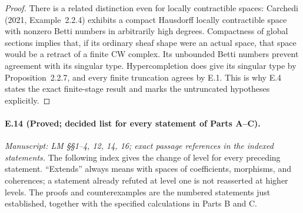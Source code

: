 \begin{proof}
There is a related distinction even for locally contractible spaces: Carchedi (2021, Example~2.2.4) exhibits a compact Hausdorff locally contractible space with nonzero Betti numbers in arbitrarily high degrees. Compactness of global sections implies that, if its ordinary sheaf shape were an actual space, that space would be a retract of a finite CW complex. Its unbounded Betti numbers prevent agreement with its singular type. Hypercompletion does give its singular type by Proposition~2.2.7, and every finite truncation agrees by E.1. This is why E.4 states the exact finite-stage result and marks the untruncated hypotheses explicitly. 
\end{proof}

\paragraph{E.14 (Proved; decided list for every statement of Parts A--C).}
\textit{Manuscript: LM \S\S1--4, 12, 14, 16; exact passage references in the indexed statements.}
The following index gives the change of level for every preceding statement. ``Extends'' always means with spaces of coefficients, morphisms, and coherences; a statement already refuted at level one is not reasserted at higher levels. The proofs and counterexamples are the numbered statements just established, together with the specified calculations in Parts B and C.

